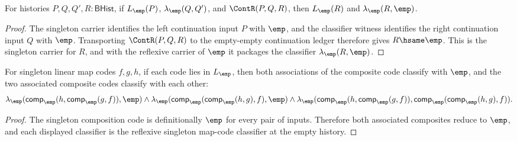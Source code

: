 \begin{theorem}
\label{thm:linearmap-singleton-classifier-continuation-right-closed}
For histories $P,Q,Q',R:\mathsf{BHist}$, if $L_{\emp}(P)$,
$\lambda_{\emp}(Q,Q')$, and $\ContR(P,Q,R)$, then $L_{\emp}(R)$ and
$\lambda_{\emp}(R,\emp)$.
\end{theorem}
\begin{proof}
The singleton carrier identifies the left continuation input $P$ with $\emp$,
and the classifier witness identifies the right continuation input $Q$ with
$\emp$. Transporting $\ContR(P,Q,R)$ to the empty-empty continuation ledger
therefore gives $R\hsame\emp$. This is the singleton carrier for $R$, and with
the reflexive carrier of $\emp$ it packages the classifier
$\lambda_{\emp}(R,\emp)$.
\end{proof}

\begin{theorem}
\label{thm:linearmap-singleton-comp-assoc-empty-classifier}
For singleton linear map codes $f,g,h$, if each code lies in
$L_{\emp}$, then both associations of the composite code classify with
$\emp$, and the two associated composite codes classify with each other:
$$
\lambda_{\emp}(\mathsf{comp}_{\emp}(h,\mathsf{comp}_{\emp}(g,f)),\emp)
\land
\lambda_{\emp}(\mathsf{comp}_{\emp}(\mathsf{comp}_{\emp}(h,g),f),\emp)
\land
\lambda_{\emp}(\mathsf{comp}_{\emp}(h,\mathsf{comp}_{\emp}(g,f)),
  \mathsf{comp}_{\emp}(\mathsf{comp}_{\emp}(h,g),f)).
$$
\end{theorem}
\begin{proof}
The singleton composition code is definitionally $\emp$ for every pair of
inputs. Therefore both associated composites reduce to $\emp$, and each
displayed classifier is the reflexive singleton map-code classifier at the
empty history.
\end{proof}

